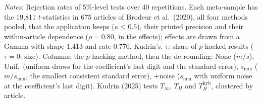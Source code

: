 \begin{table}[htbp]
\begin{tabular}{lcccccccc}
\end{tabular}
\par\smallskip
\begin{minipage}{\linewidth}\footnotesize\textit{Notes:} Rejection rates of 5\%-level tests over 40 repetitions. Each meta-sample has the 19{,}811 $t$-statistics in 675 articles of Brodeur et al.\ (2020), all four methods pooled, that the application keeps ($\kappa \le 0.5$), their printed precision and their within-article dependence ($\rho = 0.80$, in the effects); effects are drawn from a Gamma with shape 1.413 and rate 0.770, Kudrin's. $\tau$: share of $p$-hacked results ($\tau = 0$: size). Columns: the $p$-hacking method, then the de-rounding: None ($m/s$), Unif.\ (uniform draws for the coefficient's last digit and the standard error), $s_{\min}$ ($m/s_{\min}$, the smallest consistent standard error), $+$noise ($s_{\min}$ with uniform noise at the coefficient's last digit). Kudrin (2025) tests $T_\infty$, $T_H$ and $T_H^{\mathrm{hyb}}$, clustered by article.\end{minipage}
\end{table}
